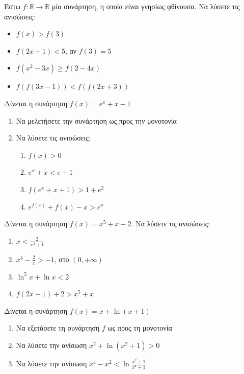 \documentclass{presentation}
\begin{document}
\begin{askisi}
  Έστω $f:\mathbb{R}\to\mathbb{R}$ μία συνάρτηση, η οποία είναι γνησίως φθίνουσα. Να λύσετε τις ανισώσεις:
  \begin{itemize}
    \item $f(x)>f(3)$
    \item $f(2x+1)<5$, αν $f(3)=5$
    \item $f(x^2-3x)\ge f(2-4x)$
    \item $f\left(f(3x-1)\right)<f\left(f(2x+3)\right)$
  \end{itemize}
\end{askisi}

\begin{askisi}
  Δίνεται η συνάρτηση $f(x)=e^x+x-1$
  \begin{enumerate}
    \item Να μελετήσετε την συνάρτηση ως προς την μονοτονία \pause
    \item Να λύσετε τις ανισώσεις:
          \begin{enumerate}
            \item $f(x)>0$ \pause
            \item $e^x+x<e+1$ \pause
            \item $f(e^x+x+1)>1+e^2$ \pause
            \item $e^{f(x)}+f(x)-x>e^x$
          \end{enumerate}
  \end{enumerate}
\end{askisi}

\begin{askisi}
  Δίνεται η συνάρτηση $f(x)=x^5+x-2$. Να λύσετε τις ανισώσεις:
  \begin{enumerate}
    \item $x<\frac{2}{x^4+1}$ \pause
    \item $x^4-\frac{2}{x}>-1$, στο $(0,+\infty)$ \pause
    \item $\ln^5 x+\ln x<2$ \pause
    \item $f(2x-1)+2>x^5+x$
  \end{enumerate}
\end{askisi}

\begin{askisi}
  Δίνεται η συνάρτηση $f(x)=x+\ln (x+1)$
  \begin{enumerate}
    \item Να εξετάσετε τη συνάρτηση $f$ ως προς τη μονοτονία \pause
    \item Να λύσετε την ανίσωση $x^2+\ln (x^2+1)>0$ \pause
    \item Να λύσετε την ανίσωση $x^4-x^2<\ln \frac{x^2+1}{x^4+1}$
  \end{enumerate}
\end{askisi}
\end{document}
